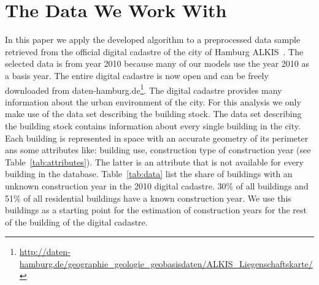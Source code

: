 \section{The Data We Work With}

In this paper we apply the developed algorithm to a preprocessed data sample
retrieved from the official digital cadastre of the city of Hamburg
ALKIS~\cite{AdV.2008}. The selected data is from year 2010 because many of our
models use the year 2010 as a basis year. The entire digital cadastre is now
open and can be freely downloaded from
daten-hamburg.de\footnote{\url{http://daten-hamburg.de/geographie_geologie_geobasisdaten/ALKIS_Liegenschaftskarte/}}.
%
The digital cadastre provides many information about the urban environment of
the city. For this analysis we only make use of the data set describing the
building stock.
%
The data set describing the building stock contains information about every
single building in the city. Each building is represented in space with an
accurate geometry of its perimeter ans some attributes like: building use,
construction type of construction year (see Table~\ref{tab:attributes}). The
latter is an attribute that is not available for every building in the
database. Table~\ref{tab:data} list the share of buildings with an unknown
construction year in the 2010 digital cadastre. 30\% of all buildings and 51\%
of all residential buildings have a known construction year. We use this
buildings as a starting point for the estimation of construction years for the
rest of the building of the digital cadastre.\\

